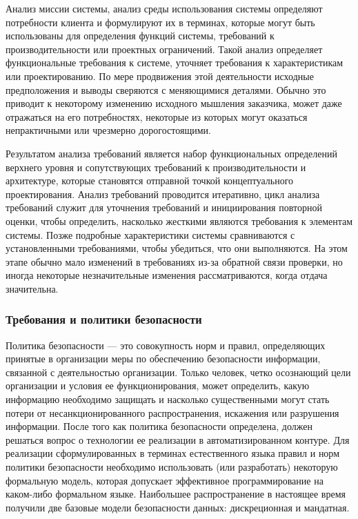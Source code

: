 Анализ миссии системы, анализ среды использования системы определяют потребности клиента и формулируют их в терминах,
которые могут быть использованы для определения функций системы, требований к производительности или проектных
ограничений. Такой анализ определяет функциональные требования к системе, уточняет требования к характеристикам
или проектированию. По мере продвижения этой деятельности исходные предположения и выводы сверяются с меняющимися
деталями. Обычно это приводит к некоторому изменению исходного мышления заказчика, может даже отражаться на его
потребностях, некоторые из которых могут оказаться непрактичными или чрезмерно дорогостоящими.

Результатом анализа требований является набор функциональных определений верхнего уровня и сопутствующих требований
к производительности и архитектуре, которые становятся отправной точкой концептуального проектирования. Анализ
требований проводится итеративно, цикл анализа требований служит для уточнения требований и инициирования
повторной оценки, чтобы определить, насколько жесткими являются требования к элементам системы. Позже подробные
характеристики системы сравниваются с установленными требованиями, чтобы убедиться, что они выполняются.
На этом этапе обычно мало изменений в требованиях из-за обратной связи проверки, но иногда некоторые незначительные
изменения рассматриваются, когда отдача значительна.

\subsubsection{Требования и политики безопасности}

Политика безопасности — это совокупность норм и правил, определяющих принятые в организации меры по обеспечению
безопасности информации, связанной с деятельностью организации. Только человек, четко осознающий цели организации
и условия ее функционирования, может определить, какую информацию необходимо защищать и насколько существенными
могут стать потери от несанкционированного распространения, искажения или разрушения информации. После того как
политика безопасности определена, должен решаться вопрос о технологии ее реализации в автоматизированном контуре.
Для реализации сформулированных в терминах естественного языка правил и норм политики безопасности необходимо
использовать (или разработать) некоторую формальную модель, которая допускает эффективное программирование на
каком-либо формальном языке. Наибольшее распространение в настоящее время получили две базовые модели безопасности
данных: дискреционная и мандатная.

